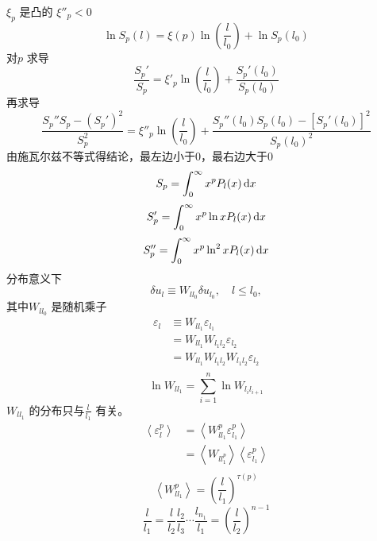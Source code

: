 \documentclass[12pt]{ctexart}
\begin{document}
$\xi_p$ 是凸的 $\xi''_p < 0$ 
\begin{equation}
   \ln S_p (l) = \xi(p) \ln \left( \frac{l}{l_0} \right) + \ln S_p(l_0)
\end{equation}
对$p$ 求导
\begin{equation}
   \frac{S_p'}{S_p} = \xi'_p \ln \left( \frac{l}{l_0} \right) + \frac{S_p'(l_0)}{S_p(l_0)}
\end{equation}
再求导
\begin{equation}
   \frac{S_p'' S_p - (S_p')^2}{S_p^2} = \xi''_p \ln \left( \frac{l}{l_0} \right) + \frac{S_p''(l_0) S_p(l_0) - [S_p'(l_0)]^2}{S_p(l_0)^2}
\end{equation}
由施瓦尔兹不等式得结论，最左边小于0，最右边大于0
\begin{equation}
   S_p = \int_{0}^{\infty} x^{p} P_l (x) \dif x 
\end{equation}
\begin{equation}
   S_p' = \int_{0}^{\infty} x^{p} \ln x P_l (x) \dif x 
\end{equation}
\begin{equation}
   S_p'' = \int_{0}^{\infty} x^{p} \ln^2 x P_l (x) \dif x 
\end{equation}
分布意义下
\begin{equation}
   \delta u_l \equiv W_{ll_0} \delta u_{l_0},\quad l\le l_0,
\end{equation}
其中$W_{ll_0}$ 是随机乘子
\begin{equation}
   \begin{aligned}
	  \varepsilon_l & \equiv W_{ll_1}\varepsilon_{l_1}\\
					&= W_{ll_1} W_{l_1l_2}\varepsilon_{l_2} \\
					&= W_{ll_1} W_{l_1 l_2}W_{l_1 l_2}\varepsilon_{l_2} \\
   \end{aligned}
\end{equation}
\begin{equation}
   \ln W_{ll_1} = \sum_{i=1}^{n} \ln W_{l_i l_{i+1}}
\end{equation}
$W_{ll_1}$ 的分布只与$\frac{l}{l_1}$ 有关。
\begin{equation}
   \begin{aligned}
	  \left< \varepsilon_l^p \right> & = \left< W_{ll_1}^{p} \varepsilon_{l_1}^{p} \right> \\
									 &= \left< W_{ll_1^{p}} \right> \left< \varepsilon_{l_1}^{p} \right>  \\
   \end{aligned}
\end{equation}
\begin{equation}
   \left< W_{ll_1}^{p} \right> = \left( \frac{l}{l_1} \right) ^{\tau(p)}
\end{equation}
\begin{equation}
   \frac{l}{l_1} = \frac{l}{l_2} \frac{l_2}{l_3} \cdots \frac{l_{n_1}}{l_1} = \left( \frac{l}{l_2} \right) ^{n-1}
\end{equation}
\end{document}
